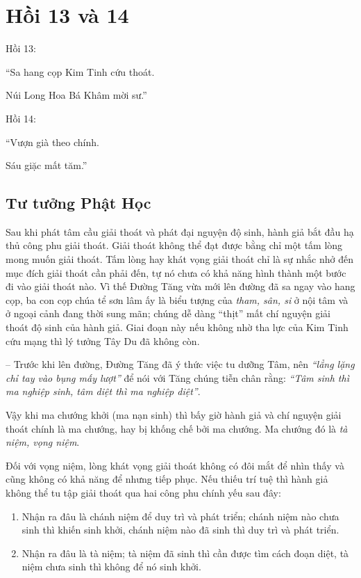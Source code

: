 \chapter{Hồi 13 và 14} %
\label{cha:hoi_13_14}

Hồi 13:

\begin{itshape}
``Sa hang cọp Kim Tinh cứu thoát.

Núi Long Hoa Bá Khâm mời sư.''
\end{itshape}

Hồi 14:

\begin{itshape}
``Vượn già theo chính.

Sáu giặc mất tăm.''
\end{itshape}

\section{Tư tưởng Phật Học} %
\label{sec:13_phat_hoc}

Sau khi phát tâm cầu giải thoát và phát đại nguyện độ sinh, hành giả bắt đầu hạ thủ công phu giải thoát. Giải thoát không thể đạt được bằng chỉ một tấm lòng mong muốn giải thoát. Tấm lòng hay khát vọng giải thoát chỉ là sự nhắc nhở đến mục đích giải thoát cần phải đến, tự nó chưa có khả năng hình thành một bước đi vào giải thoát nào. Vì thế Đường Tăng vừa mới lên đường đã sa ngay vào hang cọp, ba con cọp chúa tể sơn lâm ấy là biểu tượng của \emph{tham, sân, si} ở nội tâm và ở ngoại cảnh đang thời sung mãn; chúng dễ dàng ``thịt'' mất chí nguyện giải thoát độ sinh của hành giả. Giai đoạn này nếu không nhờ tha lực của Kim Tinh cứu mạng thì lý tưởng Tây Du đã không còn.

-- Trước khi lên đường, Đường Tăng đã ý thức việc tu dưỡng Tâm, nên \emph{``lẳng lặng chỉ tay vào bụng mấy lượt''} để nói với Tăng chúng tiễn chân rằng: \emph{``Tâm sinh thì ma nghiệp sinh, tâm diệt thì ma nghiệp diệt''}.

Vậy khi ma chướng khởi (ma nạn sinh) thì bấy giờ hành giả và chí nguyện giải thoát chính là ma chướng, hay bị khống chế bởi ma chướng. Ma chướng đó là \emph{tà niệm, vọng niệm}.

Đối với vọng niệm, lòng khát vọng giải thoát không có đôi mắt để nhìn thấy và cũng không có khả năng để nhưng tiếp phục. Nếu thiếu trí tuệ thì hành giả không thể tu tập giải thoát qua hai công phu chính yếu sau đây:

\begin{enumerate}[label=\itshape\arabic*\upshape/]
    \item Nhận ra đâu là chánh niệm để duy trì và phát triển; chánh niệm nào chưa sinh thì khiến sinh khởi, chánh niệm nào đã sinh thì duy trì và phát triển.

    \item Nhận ra đâu là tà niệm; tà niệm đã sinh thì cần được tìm cách đoạn diệt, tà niệm chưa sinh thì không để nó sinh khởi.
\end{enumerate}

